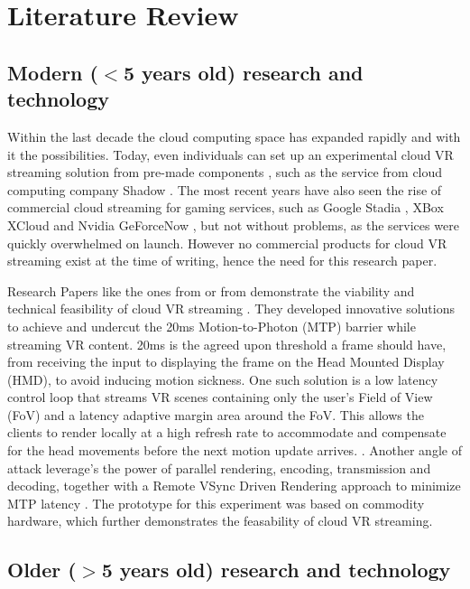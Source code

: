 \section{Literature Review}
\subsection{Modern ($<$5 years old) research and technology}

Within the last decade the cloud computing space has expanded rapidly and with it the possibilities. Today, even individuals can set up an experimental cloud VR streaming solution from pre-made components \parencite{tayoexe}, such as the service from cloud computing company Shadow \parencite{shadow}. The most recent years have also seen the rise of commercial cloud streaming for gaming services, such as Google Stadia \parencite{stadia}, XBox XCloud \parencite{xcloud} and Nvidia GeForceNow \parencite{geforcenow}, but not without problems, as the services were quickly overwhelmed on launch. However no commercial products for cloud VR streaming exist at the time of writing, hence the need for this research paper.

Research Papers like the ones from \cite{cutcord} or from \cite{mvr} demonstrate the viability and technical feasibility of cloud VR streaming . They developed innovative solutions to achieve and undercut the 20ms Motion-to-Photon (MTP) barrier while streaming VR content. 20ms is the agreed upon threshold a frame should have, from receiving the input to displaying the frame on the Head Mounted Display (HMD), to avoid inducing motion sickness. One such solution is a low latency control loop that streams VR scenes containing only the user’s Field of View (FoV) and a latency adaptive margin area around the FoV. This allows the clients to render locally at a high refresh rate to accommodate and compensate for the head movements before the next motion update arrives. \parencite{mvr}. Another angle of attack  leverage's the power of parallel rendering, encoding, transmission and decoding, together with a Remote VSync Driven Rendering approach to minimize MTP latency \parencite{cutcord}. The prototype for this experiment was based on commodity hardware, which further demonstrates the feasability of cloud VR streaming.

\subsection{Older ($>$5 years old) research and technology} 


